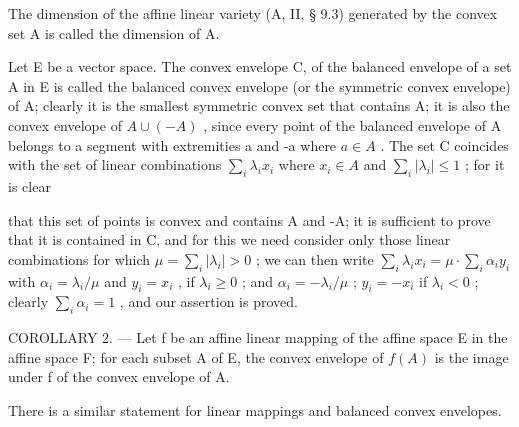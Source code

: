 The dimension of the affine linear variety (A, II, § 9.3) generated by the convex set A is called the dimension of A.

Let E be a vector space. The convex envelope C, of the balanced envelope of a set A in E is called the balanced convex envelope (or the symmetric convex envelope) of A; clearly it is the smallest symmetric convex set that contains A; it is also the convex envelope of \(A \cup (-A)\) , since every point of the balanced envelope of A belongs to a segment with extremities a and -a where \(a \in A\) . The set C coincides with the set of linear combinations \(\sum_{i} \lambda_{i} x_{i}\) where \(x_{i} \in A\) and \(\sum_{i} |\lambda_{i}| \leqslant 1\) ; for it is clear

that this set of points is convex and contains A and -A; it is sufficient to prove that it is contained in C, and for this we need consider only those linear combinations for which \(\mu = \sum_{i} |\lambda_{i}| > 0\) ; we can then write \(\sum_{i} \lambda_{i} x_{i} = \mu \cdot \sum_{i} \alpha_{i} y_{i}\) with \(\alpha_{i} = \lambda_{i} / \mu\) and \(y_{i} = x_{i}\) , if \(\lambda_{i} \geqslant 0\) ; and \(\alpha_{i} = -\lambda_{i} / \mu\) ; \(y_{i} = -x_{i}\) if \(\lambda_{i} < 0\) ; clearly \(\sum_{i} \alpha_{i} = 1\) , and our assertion is proved.

COROLLARY 2. --- Let f be an affine linear mapping of the affine space E in the affine space F; for each subset A of E, the convex envelope of \(f(A)\) is the image under f of the convex envelope of A.

There is a similar statement for linear mappings and balanced convex envelopes.

